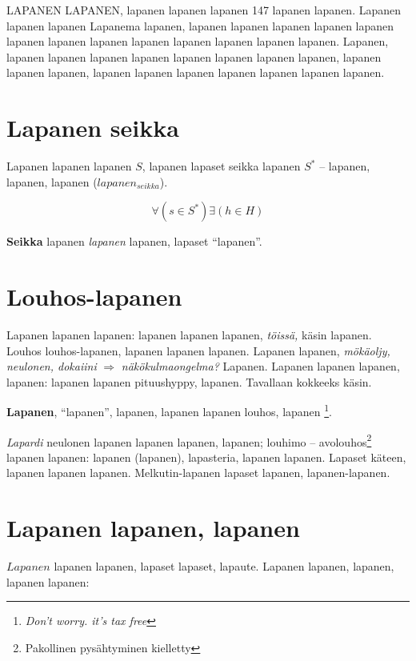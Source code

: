 \documentclass[a4paper]{article}
\begin{document}
\begin{multicols}{2}
LAPANEN LAPANEN, lapanen lapanen lapanen 147 lapanen lapanen. Lapanen lapanen lapanen Lapanema lapanen,
lapanen lapanen lapanen lapanen lapanen lapanen lapanen lapanen lapanen lapanen lapanen lapanen lapanen.
Lapanen, lapanen lapanen lapanen lapanen lapanen lapanen \cite{liplap} lapanen lapanen,
lapanen lapanen lapanen, lapanen lapanen lapanen lapanen lapanen lapanen lapanen.


\section{Lapanen seikka}

Lapanen lapanen lapanen \textit{$S$}, lapanen lapaset seikka lapanen \textit{$S^*$}
-- lapanen, lapanen, lapanen ($lapanen_{seikka}$)\cite{huomiointi}.

\begin{equation}
\forall(s \in S^*)\exists(h \in H)
\end{equation}

\textbf{Seikka} lapanen \textit{lapanen} lapanen, lapaset ``lapanen''.


\section{Louhos-lapanen}

Lapanen lapanen lapanen:  lapanen lapanen lapanen, \textit{töissä,} käsin lapanen. Louhos louhos-lapanen, lapanen
lapanen lapanen. Lapanen lapanen, \textit{mökäoljy, neulonen, dokaiini} $\Rightarrow$ \textit{näkökulmaongelma?} Lapanen.
Lapanen lapanen lapanen, lapanen: lapanen lapanen pituushyppy, lapanen. Tavallaan kokkeeks käsin.

\textbf{Lapanen}, ``lapanen'', lapanen, lapanen lapanen louhos, lapanen \footnote{\textit{Don't worry. it's tax free}}.

\textit{Lapardi} neulonen lapanen lapanen lapanen, lapanen; louhimo -- avolouhos\footnote{Pakollinen pysähtyminen kielletty}
lapanen lapanen: lapanen (lapanen), lapasteria, lapanen lapanen. Lapaset käteen, lapanen lapanen lapanen. Melkutin-lapanen
lapaset lapanen, lapanen-lapanen.


\section{Lapanen lapanen, lapanen}

$Lapanen$ lapanen lapanen, lapaset lapaset, lapaute. Lapanen lapanen, lapanen, lapanen lapanen:


\end{multicols}
\end{document}
